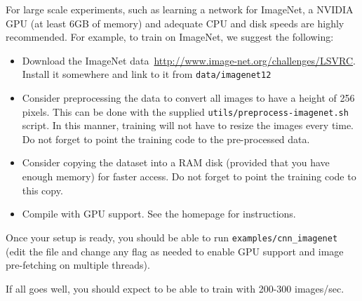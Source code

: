 For large scale experiments, such as learning a network for ImageNet, a NVIDIA GPU (at least 6GB of memory) and adequate CPU and disk speeds are highly recommended. For example, to train on ImageNet, we suggest the following:
\begin{itemize}
\item Download the ImageNet data~\url{http://www.image-net.org/challenges/LSVRC}. Install it somewhere and link to it from \verb!data/imagenet12!
\item Consider preprocessing the data to convert all images to have a height of 256 pixels. This can be done with the supplied \verb!utils/preprocess-imagenet.sh! script. In this manner, training will not have to resize the images every time. Do not forget to point the training code to the pre-processed data.
\item Consider copying the dataset into a RAM disk (provided that you have enough memory) for faster access. Do not forget to point the training code to this copy.
\item Compile \matconvnet with GPU support. See the homepage for instructions.
\end{itemize}

Once your setup is ready, you should be able to run \verb!examples/cnn_imagenet! (edit the file and change any flag as needed to enable GPU support and image pre-fetching on multiple threads).

If all goes well, you should expect to be able to train with 200-300 images/sec.